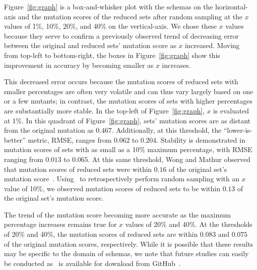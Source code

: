 

Figure~\ref{fig:graph} is a box-and-whisker plot with the schemas on the horizontal-axis and the mutation scores of the
reduced sets after random sampling at the $x$ values of 1\%, 10\%, 20\%, and 40\% on the vertical-axis.  We chose these
$x$ values because they serve to confirm a previously observed trend of decreasing error between the original and reduced
sets' mutation score as $x$
increased. Moving from top-left to bottom-right, the boxes in Figure~\ref{fig:graph} show this improvement in accuracy
by becoming smaller as $x$ increases.



This decreased error occurs because the mutation scores of reduced sets with smaller percentages are
often very volatile and can thus vary largely based on one or a few mutants; in contrast, the mutation scores of sets
with higher percentages are substantially more stable. In the top-left of Figure~\ref{fig:graph}, $x$ is
evaluated at 1\%.  In this quadrant of Figure~\ref{fig:graph}, sets' mutation scores are as distant from the original
mutation as $0.467$.  Additionally, at this threshold, the ``lower-is-better'' metric, RMSE, ranges from $0.062$ to
$0.204$.  Stability is demonstrated in mutation scores of sets with as small as a 10\% maximum percentage,
with RMSE ranging from $0.013$ to $0.065$.  At this same threshold, Wong and Mathur observed that mutation scores of
reduced sets were within $0.16$ of the original set's mutation score~\cite{mathur1994empirical}. Using \mr~to
retrospectively perform random sampling with an $x$ value of 10\%, we observed mutation scores of reduced sets to be
within $0.13$ of the original set's mutation score.


The trend of the mutation score becoming more accurate as the maximum percentage increases remains true for
$x$ values of 20\% and 40\%. At the thresholds of 20\% and 40\%, the mutation scores of reduced sets are within $0.083$
and $0.075$ of the original mutation scores, respectively. While it is possible that these results may be specific to
the domain of schemas, we note that future studies can easily be conducted as \mr~is available for download from
GitHub~\cite{tool}.



